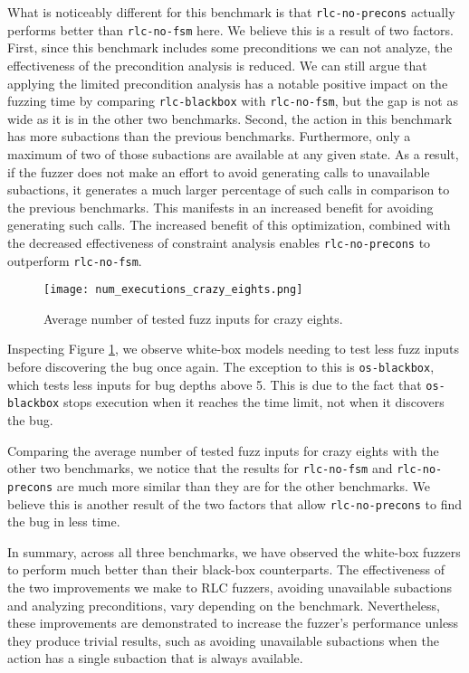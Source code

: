 What is noticeably different for this benchmark is that \texttt{rlc-no-precons} actually performs better than \texttt{rlc-no-fsm} here.
We believe this is a result of two factors.
First, since this benchmark includes some preconditions we can not analyze, the effectiveness of the precondition analysis is reduced.
We can still argue that applying the limited precondition analysis has a notable positive impact on the fuzzing time by comparing \texttt{rlc-blackbox} with \texttt{rlc-no-fsm}, but the gap is not as wide as it is in the other two benchmarks.
Second, the action in this benchmark has more subactions than the previous benchmarks.
Furthermore, only a maximum of two of those subactions are available at any given state.
As a result, if the fuzzer does not make an effort to avoid generating calls to unavailable subactions, it generates a much larger percentage of such calls in comparison to the previous benchmarks.
This manifests in an increased benefit for avoiding generating such calls.
The increased benefit of this optimization, combined with the decreased effectiveness of constraint analysis enables \texttt{rlc-no-precons} to outperform \texttt{rlc-no-fsm}.

\begin{figure}[h]
    \centering
    \texttt{[image: num\_executions\_crazy\_eights.png]}
    \caption{Average number of tested fuzz inputs for crazy eights.}
    \label{avgInputsCrazyEights}
\end{figure}

Inspecting Figure \ref{avgInputsCrazyEights}, we observe white-box models needing to test less fuzz inputs before discovering the bug once again.
The exception to this is \texttt{os-blackbox}, which tests less inputs for bug depths above 5.
This is due to the fact that \texttt{os-blackbox} stops execution when it reaches the time limit, not when it discovers the bug.

Comparing the average number of tested fuzz inputs for crazy eights with the other two benchmarks, we notice that the results for \texttt{rlc-no-fsm} and \texttt{rlc-no-precons} are much more similar than they are for the other benchmarks.
We believe this is another result of the two factors that allow \texttt{rlc-no-precons} to find the bug in less time.

In summary, across all three benchmarks, we have observed the white-box fuzzers to perform much better than their black-box counterparts.
The effectiveness of the two improvements we make to RLC fuzzers, avoiding unavailable subactions and analyzing preconditions, vary depending on the benchmark.
Nevertheless, these improvements are demonstrated to increase the fuzzer's performance unless they produce trivial results, such as avoiding unavailable subactions when the action has a single subaction that is always available.

